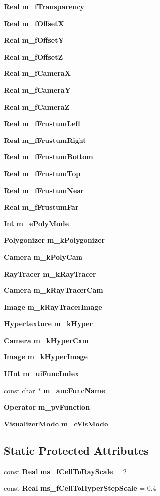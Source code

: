 \begin{CompactItemize}
{\bf Real} {\bf m\_\-f\-Transparency}
\item 
{\bf Real} {\bf m\_\-f\-Offset\-X}
\item 
{\bf Real} {\bf m\_\-f\-Offset\-Y}
\item 
{\bf Real} {\bf m\_\-f\-Offset\-Z}
\item 
{\bf Real} {\bf m\_\-f\-Camera\-X}
\item 
{\bf Real} {\bf m\_\-f\-Camera\-Y}
\item 
{\bf Real} {\bf m\_\-f\-Camera\-Z}
\item 
{\bf Real} {\bf m\_\-f\-Frustum\-Left}
\item 
{\bf Real} {\bf m\_\-f\-Frustum\-Right}
\item 
{\bf Real} {\bf m\_\-f\-Frustum\-Bottom}
\item 
{\bf Real} {\bf m\_\-f\-Frustum\-Top}
\item 
{\bf Real} {\bf m\_\-f\-Frustum\-Near}
\item 
{\bf Real} {\bf m\_\-f\-Frustum\-Far}
\item 
{\bf Int} {\bf m\_\-e\-Poly\-Mode}
\item 
{\bf Polygonizer} {\bf m\_\-k\-Polygonizer}
\item 
{\bf Camera} {\bf m\_\-k\-Poly\-Cam}
\item 
{\bf Ray\-Tracer} {\bf m\_\-k\-Ray\-Tracer}
\item 
{\bf Camera} {\bf m\_\-k\-Ray\-Tracer\-Cam}
\item 
{\bf Image} {\bf m\_\-k\-Ray\-Tracer\-Image}
\item 
{\bf Hypertexture} {\bf m\_\-k\-Hyper}
\item 
{\bf Camera} {\bf m\_\-k\-Hyper\-Cam}
\item 
{\bf Image} {\bf m\_\-k\-Hyper\-Image}
\item 
{\bf UInt} {\bf m\_\-ui\-Func\-Index}
\item 
const char $\ast$ {\bf m\_\-auc\-Func\-Name}
\item 
{\bf Operator} {\bf m\_\-pv\-Function}
\item 
{\bf Visualizer\-Mode} {\bf m\_\-e\-Vis\-Mode}
\end{CompactItemize}
\subsection*{Static Protected Attributes}
\begin{CompactItemize}
\item 
const {\bf Real} {\bf ms\_\-f\-Cell\-To\-Ray\-Scale} = 2
\item 
const {\bf Real} {\bf ms\_\-f\-Cell\-To\-Hyper\-Step\-Scale} = 0.4
\end{CompactItemize}


